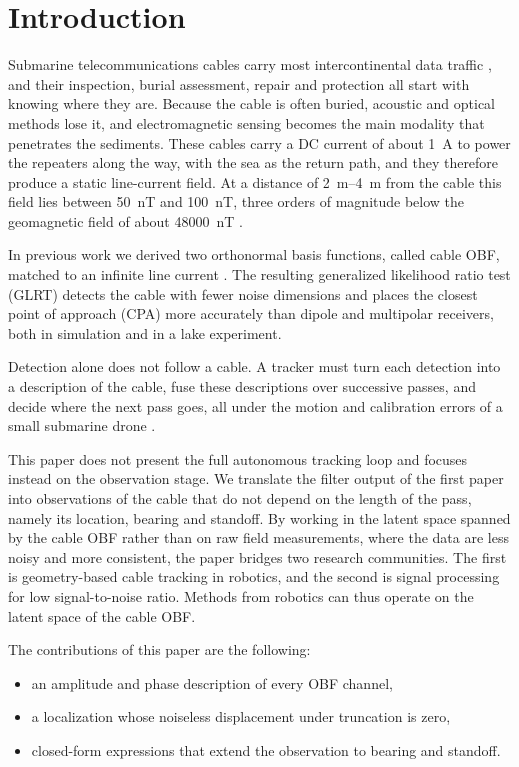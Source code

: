 \section{Introduction}
\label{sec:intro}

Submarine telecommunications cables carry most intercontinental data traffic , and their inspection, burial assessment, repair and protection all start with knowing where they are.
Because the cable is often buried, acoustic and optical methods lose it, and electromagnetic sensing becomes the main modality that penetrates the sediments.
These cables carry a DC current of about \SI{1}{\ampere} to power the repeaters along the way, with the sea as the return path, and they therefore produce a static line-current field.
At a distance of \SIrange{2}{4}{\metre} from the cable this field lies between \SI{50}{\nano\tesla} and \SI{100}{\nano\tesla}, three orders of magnitude below the geomagnetic field of about \SI{48000}{\nano\tesla} .

In previous work we derived two orthonormal basis functions, called cable OBF, matched to an infinite line current .
The resulting generalized likelihood ratio test (GLRT) detects the cable with fewer noise dimensions and places the closest point of approach (CPA) more accurately than dipole and multipolar receivers, both in simulation and in a lake experiment.

Detection alone does not follow a cable.
A tracker must turn each detection into a description of the cable, fuse these descriptions over successive passes, and decide where the next pass goes, all under the motion and calibration errors of a small submarine drone .

This paper does not present the full autonomous tracking loop and focuses instead on the observation stage.
We translate the filter output of the first paper into observations of the cable that do not depend on the length of the pass, namely its location, bearing and standoff.
By working in the latent space spanned by the cable OBF rather than on raw field measurements, where the data are less noisy and more consistent, the paper bridges two research communities.
The first is geometry-based cable tracking in robotics, and the second is signal processing for low signal-to-noise ratio.
Methods from robotics can thus operate on the latent space of the cable OBF.

The contributions of this paper are the following:
\begin{itemize}
  \item an amplitude and phase description of every OBF channel,
  \item a localization whose noiseless displacement under truncation is zero,
  \item closed-form expressions that extend the observation to bearing and standoff.
\end{itemize}


